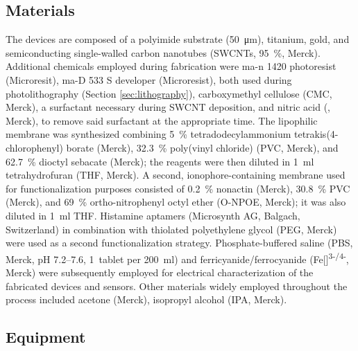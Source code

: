 \subsection{Materials}

The devices are composed of a polyimide substrate (\SI{50}{\um}), titanium, gold, and semiconducting single-walled carbon nanotubes (SWCNTs, \SI{95}{\%}, Merck). Additional chemicals employed during fabrication were
ma-n 1420 photoresist (Microresit), ma-D 533 S developer (Microresist), both used during photolithography (Section \ref{sec:lithography}), carboxymethyl cellulose (CMC, Merck), a surfactant necessary during SWCNT deposition, and nitric acid (, Merck), to remove said surfactant at the appropriate time. The lipophilic membrane was synthesized combining \SI{5}{\%} tetradodecylammonium tetrakis(4-chlorophenyl) borate (Merck), \SI{32.3}{\%} poly(vinyl chloride) (PVC, Merck), and \SI{62.7}{\%} dioctyl sebacate (Merck); the reagents were then diluted in \SI{1}{\ml} tetrahydrofuran (THF, Merck). A second, ionophore-containing membrane used for functionalization purposes consisted of \SI{0.2}{\%} nonactin (Merck), \SI{30.8}{\%} PVC (Merck), and \SI{69}{\%} ortho-nitrophenyl octyl ether (O-NPOE, Merck); it was also diluted in \SI{1}{\ml} THF. Histamine aptamers (Microsynth AG, Balgach, Switzerland) in combination with thiolated polyethylene glycol (PEG, Merck) were used as a second functionalization strategy. Phosphate-buffered saline (PBS, Merck, pH 7.2--7.6, \SI{1}{tablet} per \SI{200}{\ml}) and ferricyanide/ferrocyanide (Fe[]\textsuperscript{3-/4-}, Merck) were subsequently employed for electrical characterization of the fabricated devices and sensors. Other materials widely employed throughout the process included acetone (Merck), isopropyl alcohol (IPA, Merck).

\subsection{Equipment}


